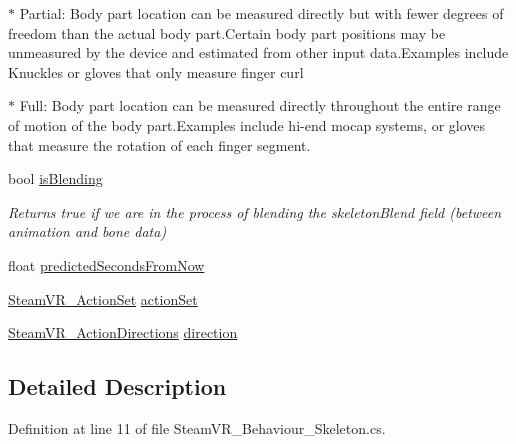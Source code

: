 \begin{DoxyCompactItemize}
\begin{DoxyCompactList}
$\ast$ Partial\+: Body part location can be measured directly but with fewer degrees of freedom than the actual body part.\+Certain body part positions may be unmeasured by the device and estimated from other input data.\+Examples include Knuckles or gloves that only measure finger curl 

$\ast$ Full\+: Body part location can be measured directly throughout the entire range of motion of the body part.\+Examples include hi-\/end mocap systems, or gloves that measure the rotation of each finger segment. \end{DoxyCompactList}\item 
bool \mbox{\hyperlink{class_valve_1_1_v_r_1_1_steam_v_r___behaviour___skeleton_a5bd599d35eca46710075fe6ae0e2dae6}{is\+Blending}}
\begin{DoxyCompactList}\small\item\em Returns true if we are in the process of blending the skeleton\+Blend field (between animation and bone data) \end{DoxyCompactList}\item 
float \mbox{\hyperlink{class_valve_1_1_v_r_1_1_steam_v_r___behaviour___skeleton_a39ab0add84ea35e08ebc487e6d37676d}{predicted\+Seconds\+From\+Now}}
\item 
\mbox{\hyperlink{class_valve_1_1_v_r_1_1_steam_v_r___action_set}{Steam\+V\+R\+\_\+\+Action\+Set}} \mbox{\hyperlink{class_valve_1_1_v_r_1_1_steam_v_r___behaviour___skeleton_a5f4dba4ffc2453fbc3d7bb5274f3dc0d}{action\+Set}}
\item 
\mbox{\hyperlink{namespace_valve_1_1_v_r_a1e6192cb5ddaf204afab87ccb5728780}{Steam\+V\+R\+\_\+\+Action\+Directions}} \mbox{\hyperlink{class_valve_1_1_v_r_1_1_steam_v_r___behaviour___skeleton_a9d389651b9b3c748b219bc5c733745a7}{direction}}
\end{DoxyCompactItemize}


\subsection{Detailed Description}


Definition at line 11 of file Steam\+V\+R\+\_\+\+Behaviour\+\_\+\+Skeleton.\+cs.



